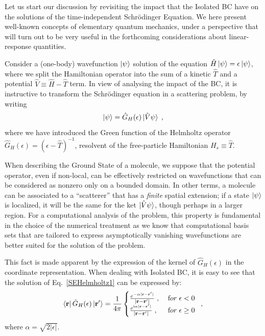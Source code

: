 \documentclass[reprint,aps,prb]{revtex4-1}
\renewcommand{\r}{{\bf r}}
\newcommand{\eps}{\epsilon}
\newcommand{\ii}{\mathrm{i}}
\newcommand{\be}{\begin{equation}}
\newcommand{\ee}{\end{equation}}
\newcommand{\lb}{\label}
\newcommand{\op}[1]{\hat {#1}}
\begin{document}
Let us start our discussion by revisiting the impact that the Isolated BC have on the 
solutions of the time-independent Schr\"odinger Equation.
We here present well-known concepts of elementary quantum mechanics, under a perspective that
will turn out to be very useful in the forthcoming considerations about linear-response quantities.

Consider a (one-body) wavefunction $\ket{\psi}$ solution of the equation
$\op H\ket{\psi}=\eps\ket{\psi}$, where we split the Hamiltonian operator into the sum of
a kinetic $\op T$ and a potential $\op V \equiv \op H - \op T$ term.
In view of analysing the impact of the BC, it is instructive to transform 
the Schr\"odinger equation in a scattering problem, by writing
\be\lb{SEHelmholtz1}
\ket{\psi} = \op G_H(\eps)\ket{\op V\psi}\;,
\ee
where we have introduced the Green function of the Helmholtz operator $\op G_H(\eps) = (\eps-\op T)^{-1}$,
resolvent of the free-particle Hamiltonian $H_s \equiv \op T$.

When describing the Ground State of a molecule, we suppose that the potential operator, even if non-local,
can be effectively restricted on wavefunctions that can be considered as nonzero only on a
bounded domain. In other terms, a molecule can be associated to a ``scatterer'' that has a \emph{finite} 
spatial extension; if a state $\ket{\psi}$ is localized, it will be the same for the ket $\ket{\op V \psi}$, though 
perhaps in a larger region.
For a computational analysis of the problem, this property is fundamental in the choice of the numerical treatment as we know that
computational basis sets 
that are tailored to express asymptotically vanishing wavefunctions are better suited for the solution of the problem.

This fact is made apparent by the expression of 
the kernel of $\op G_H(\eps)$ in the coordinate representation. 
When dealing with Isolated BC, it is easy to see that the solution of Eq.~\eqref{SEHelmholtz1}
can be expressed by:
\be\lb{HelmholtzKernelDef1}
\bra{\r} \op G_H(\eps) \ket{\r'} = \frac{1}{4\pi} \begin{cases}
\frac{e^{-\alpha|\r - \r' |}}{|\r- \r' |} \;,\; & {\textrm for}\; \eps  < 0\; \\ 
\frac{e^{\ii \alpha |\r-\r' |}}{|\r-\r' |} \;, & {\textrm for} \; \eps \geq 0
\end{cases} \;,
\ee
where $\alpha = \sqrt{2|\eps|}$. 
\end{document}
